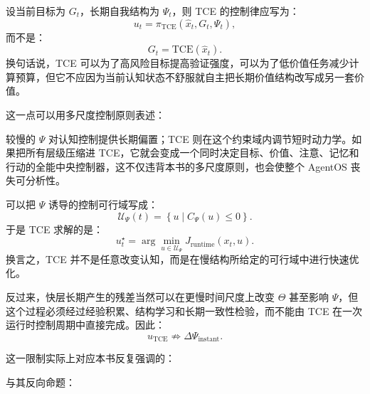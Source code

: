 设当前目标为 $G_t$，长期自我结构为 $\Psi_t$，则 TCE 的控制律应写为：
\begin{equation}
    u_t
    =
    \pi_{\mathrm{TCE}}
    (
    \hat x_t,
    G_t,
    \Psi_t
    ),
\end{equation}
而不是：
\begin{equation}
    G_t
    =
    \mathrm{TCE}(\hat x_t).
\end{equation}
换句话说，TCE 可以为了高风险目标提高验证强度，可以为了低价值任务减少计算预算，但它不应因为当前认知状态不舒服就自主把长期价值结构改写成另一套价值。

这一点可以用多尺度控制原则表述：
\begin{statementbox}
\centering
{}
\end{statementbox}
较慢的 $\Psi$ 对认知控制提供长期偏置；TCE 则在这个约束域内调节短时动力学。如果把所有层级压缩进 TCE，它就会变成一个同时决定目标、价值、注意、记忆和行动的全能中央控制器，这不仅违背本书的多尺度原则，也会使整个 AgentOS 丧失可分析性。

可以把 $\Psi$ 诱导的控制可行域写成：
\begin{equation}
    \mathcal U_{\Psi}(t)
    =
    \left\{
    u
    \mid
    C_{\Psi}(u)\le 0
    \right\}.
\end{equation}
于是 TCE 求解的是：
\begin{equation}
    u_t^\star
    =
    \arg\min_{u\in\mathcal U_{\Psi}}
    J_{\mathrm{runtime}}(x_t,u).
\end{equation}
换言之，TCE 并不是任意改变认知，而是在慢结构所给定的可行域中进行快速优化。

反过来，快层长期产生的残差当然可以在更慢时间尺度上改变 $\Theta$ 甚至影响 $\Psi$，但这个过程必须经过经验积累、结构学习和长期一致性检验，而不能由 TCE 在一次运行时控制周期中直接完成。因此：
\begin{equation}
    u_{\mathrm{TCE}}
    \not\Rightarrow
    \Delta\Psi_{\mathrm{instant}}.
\end{equation}

这一限制实际上对应本书反复强调的：
\begin{statementbox}
\centering
{}
\end{statementbox}
与其反向命题：
\begin{statementbox}
\centering
{}
\end{statementbox}

